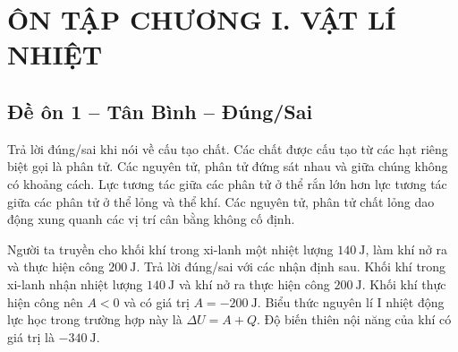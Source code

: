 
\section{ÔN TẬP CHƯƠNG I. VẬT LÍ NHIỆT}
\subsection{Đề ôn 1 -- Tân Bình -- Đúng/Sai}

\begin{ex}
Trả lời đúng/sai khi nói về cấu tạo chất.
\choiceTF
{\True Các chất được cấu tạo từ các hạt riêng biệt gọi là phân tử.}
{Các nguyên tử, phân tử đứng sát nhau và giữa chúng không có khoảng cách.}
{\True Lực tương tác giữa các phân tử ở thể rắn lớn hơn lực tương tác giữa các phân tử ở thể lỏng và thể khí.}
{\True Các nguyên tử, phân tử chất lỏng dao động xung quanh các vị trí cân bằng không cố định.}
\end{ex}

\begin{ex}
Người ta truyền cho khối khí trong xi-lanh một nhiệt lượng $140\ \mathrm{J}$, làm khí nở ra và thực hiện công $200\ \mathrm{J}$. Trả lời đúng/sai với các nhận định sau.
\choiceTF
{\True Khối khí trong xi-lanh nhận nhiệt lượng $140\ \mathrm{J}$ và khí nở ra thực hiện công $200\ \mathrm{J}$.}
{\True Khối khí thực hiện công nên $A<0$ và có giá trị $A=-200\ \mathrm{J}$.}
{\True Biểu thức nguyên lí I nhiệt động lực học trong trường hợp này là $\Delta U=A+Q$.}
{Độ biến thiên nội năng của khí có giá trị là $-340\ \mathrm{J}$.}
\end{ex}

